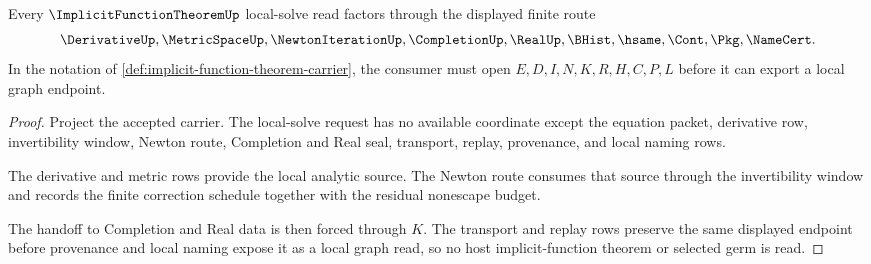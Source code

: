 \begin{theorem}
\label{thm:implicit-function-theorem-newton-completion-handoff}
Every $\ImplicitFunctionTheoremUp$ local-solve read factors through the displayed finite route
$$
\DerivativeUp,\MetricSpaceUp,\NewtonIterationUp,\CompletionUp,\RealUp,\BHist,\hsame,\Cont,\Pkg,\NameCert .
$$
In the notation of \autoref{def:implicit-function-theorem-carrier}, the consumer must open $E,D,I,N,K,R,H,C,P,L$ before it can export a local graph endpoint.
\end{theorem}
\begin{proof}
Project the accepted carrier. The local-solve request has no available coordinate except the equation packet, derivative row, invertibility window, Newton route, Completion and Real seal, transport, replay, provenance, and local naming rows.

The derivative and metric rows provide the local analytic source. The Newton route consumes that source through the invertibility window and records the finite correction schedule together with the residual nonescape budget.

The handoff to Completion and Real data is then forced through $K$. The transport and replay rows preserve the same displayed endpoint before provenance and local naming expose it as a local graph read, so no host implicit-function theorem or selected germ is read.
\end{proof}




